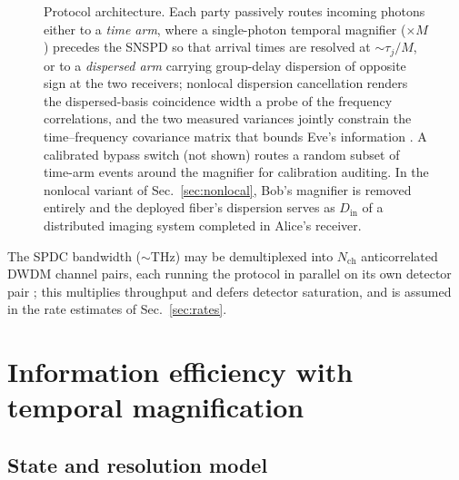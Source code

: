 \documentclass[11pt]{article}
\begin{document}
\begin{figure}[t]
{%
}
\caption{Protocol architecture. Each party passively routes incoming photons either to a \emph{time arm}, where a single-photon temporal magnifier ($\times M$) precedes the SNSPD so that arrival times are resolved at $\sim\tau_j/M$, or to a \emph{dispersed arm} carrying group-delay dispersion of opposite sign at the two receivers; nonlocal dispersion cancellation renders the dispersed-basis coincidence width a probe of the frequency correlations, and the two measured variances jointly constrain the time--frequency covariance matrix that bounds Eve's information \cite{Mower2013,Zhang2014}. A calibrated bypass switch (not shown) routes a random subset of time-arm events around the magnifier for calibration auditing. In the nonlocal variant of Sec.~\ref{sec:nonlocal}, Bob's magnifier is removed entirely and the deployed fiber's dispersion serves as $D_{\mathrm{in}}$ of a distributed imaging system completed in Alice's receiver.}
\label{fig:arch}
\end{figure}

The SPDC bandwidth ($\sim$THz) may be demultiplexed into $N_{\mathrm{ch}}$ anticorrelated DWDM channel pairs, each running the protocol in parallel on its own detector pair \cite{Mower2011}; this multiplies throughput and defers detector saturation, and is assumed in the rate estimates of Sec.~\ref{sec:rates}.

\section{Information efficiency with temporal magnification}
\label{sec:theory}

\subsection{State and resolution model}
\end{document}
